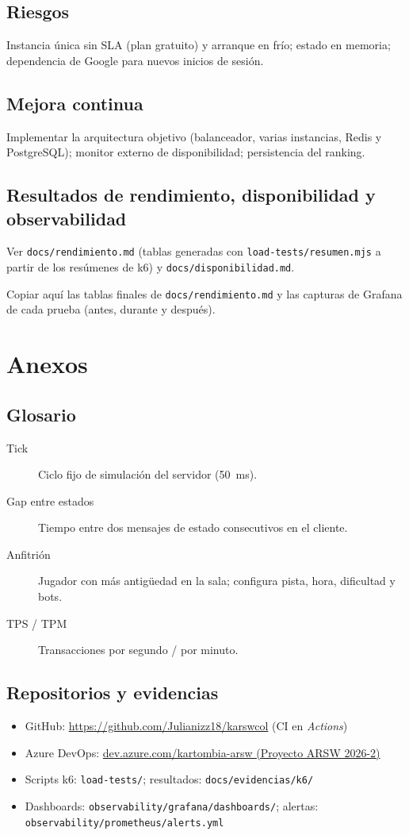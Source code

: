 \documentclass[11pt,a4paper]{article}
\begin{document}
\subsection{Riesgos}
Instancia única sin SLA (plan gratuito) y arranque en frío; estado en
memoria; dependencia de Google para nuevos inicios de sesión.

\subsection{Mejora continua}
Implementar la arquitectura objetivo (balanceador, varias instancias,
Redis y PostgreSQL); monitor externo de disponibilidad; persistencia del
ranking.

\subsection{Resultados de rendimiento, disponibilidad y observabilidad}
\label{sec:resultados-rendimiento}
Ver \texttt{docs/rendimiento.md} (tablas generadas con
\texttt{load-tests/resumen.mjs} a partir de los resúmenes de k6) y
\texttt{docs/disponibilidad.md}.
\begin{pendiente}
Copiar aquí las tablas finales de \texttt{docs/rendimiento.md} y las
capturas de Grafana de cada prueba (antes, durante y después).
\end{pendiente}

\section{Anexos}
\subsection*{Glosario}
\begin{description}
  \item[Tick] Ciclo fijo de simulación del servidor (50~ms).
  \item[Gap entre estados] Tiempo entre dos mensajes de estado consecutivos en el cliente.
  \item[Anfitrión] Jugador con más antigüedad en la sala; configura pista, hora, dificultad y bots.
  \item[TPS / TPM] Transacciones por segundo / por minuto.
\end{description}
\subsection*{Repositorios y evidencias}
\begin{itemize}
  \item GitHub: \url{https://github.com/Julianizz18/karswcol} (CI en \emph{Actions})
  \item Azure DevOps: \href{https://dev.azure.com/kartombia-arsw/Proyecto\%20ARSW\%202026-2}{dev.azure.com/kartombia-arsw (Proyecto ARSW 2026-2)}
  \item Scripts k6: \texttt{load-tests/}; resultados: \texttt{docs/evidencias/k6/}
  \item Dashboards: \texttt{observability/grafana/dashboards/}; alertas: \texttt{observability/prometheus/alerts.yml}
\end{itemize}
\end{document}
